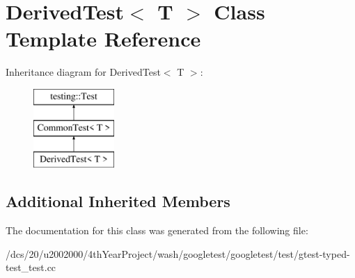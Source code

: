 \hypertarget{classDerivedTest}{}\section{Derived\+Test$<$ T $>$ Class Template Reference}
\label{classDerivedTest}
Inheritance diagram for Derived\+Test$<$ T $>$\+:\begin{figure}[H]
\begin{center}
\leavevmode
\includegraphics[height=3.000000cm]{classDerivedTest}
\end{center}
\end{figure}
\subsection*{Additional Inherited Members}


The documentation for this class was generated from the following file\+:\begin{DoxyCompactItemize}
\item 
/dcs/20/u2002000/4th\+Year\+Project/wash/googletest/googletest/test/gtest-\/typed-\/test\+\_\+test.\+cc\end{DoxyCompactItemize}
